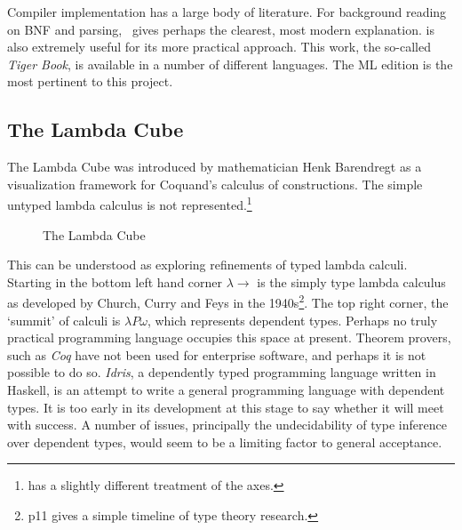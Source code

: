 \documentclass[12pt, a4paper]{report}
\begin{document}
Compiler implementation has a large body of literature. For background reading on \gls{BNF} and
parsing,~\cite{torc} gives perhaps the clearest, most modern explanation.
\cite{Appel:1997:MCI:248430} is also extremely useful for its more practical approach. This work,
the so-called \textit{Tiger Book}, is available in a number of different languages. The ML edition is
the most pertinent to this project.

\subsection{The Lambda Cube}
The Lambda Cube was introduced by mathematician Henk Barendregt as a visualization framework for
Coquand's calculus of constructions\cite{Barendregt:1993:LCT:162552.162561}. The simple untyped lambda calculus is not
represented.\footnote{\cite{Pierce:2002:TPL:509043} has a slightly different treatment of the axes.}

\begin{figure} %
    \centering
    \caption{The Lambda Cube}
    \label{fig:cube}
\end{figure}

This can be understood as exploring refinements of typed lambda calculi. Starting in the bottom
left hand corner $\lambda \rightarrow$ is the simply type lambda calculus as developed by Church,
Curry and Feys in the 1940s\footnote{\cite{Pierce:2002:TPL:509043} p11 gives a simple timeline
of type theory research.}. The top right corner, the `summit' of calculi is $\lambda P \omega$,
which represents \gls{dependent types}. Perhaps no truly practical programming language occupies this
space at present. Theorem provers, such as \textit{\gls{Coq}} have not been used for enterprise software,
and perhaps it is not possible to do so. \textit{Idris}, a dependently typed programming language
written in Haskell, is an attempt to write a general programming language with dependent types. It
is too early in its development at this stage to say whether it will meet with success. A number of
issues, principally the undecidability of type inference over dependent types, would seem to be a
limiting factor to general acceptance.
\end{document}

